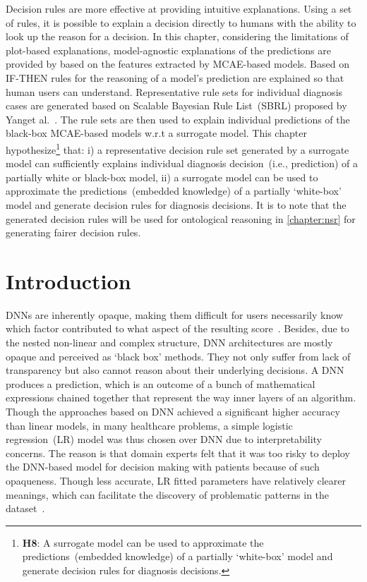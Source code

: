 \hspace*{3.5mm} Decision rules are more effective at providing intuitive explanations. Using a set of rules, it is possible to explain a decision directly to humans with the ability to look up the reason for a decision. In this chapter, considering the limitations of plot-based explanations, model-agnostic explanations of the predictions are provided by based on the features extracted by MCAE-based models. Based on IF-THEN rules for the reasoning of a model's prediction are explained so that human users can understand.  %
Representative rule sets for individual diagnosis cases are generated based on Scalable Bayesian Rule List~(SBRL) proposed by Yanget al.~\cite{BayesianRule}. The rule sets are then used to explain individual predictions of the black-box MCAE-based models w.r.t a surrogate model. 
This chapter hypothesize\footnote{\textbf{H8}: A surrogate model can be used to approximate the predictions~(embedded knowledge) of a partially `white-box' model and generate decision rules for diagnosis decisions.} that: i) a representative decision rule set generated by a surrogate model can sufficiently explains individual diagnosis decision~(i.e., prediction) of a partially white or black-box model, ii) a surrogate model can be used to approximate the predictions~(embedded knowledge) of a partially `white-box' model and generate decision rules for diagnosis decisions.
It is to note that the generated decision rules will be used for ontological reasoning in \cref{chapter:nsr} for generating fairer decision rules.


\section{Introduction} \label{chapter_7:intro}
DNNs are inherently opaque, making them difficult for users necessarily know which factor contributed to what aspect of the resulting score~\cite{ribeiro2018anchors}. Besides, due to the nested non-linear and complex structure, DNN architectures are mostly opaque and perceived as `black box' methods. They not only suffer from lack of transparency but also cannot reason about their underlying decisions. A DNN produces a prediction, which is an outcome of a bunch of mathematical expressions chained together that represent the way inner layers of an algorithm. Though the approaches based on DNN achieved a significant higher accuracy than linear models, in many healthcare problems, a simple logistic regression~(LR) model was thus chosen over DNN due to interpretability concerns. The reason is that domain experts felt that it was too risky to deploy the DNN-based model for decision making with patients because of such opaqueness. Though less accurate, LR fitted parameters have relatively clearer meanings, which can facilitate the discovery of problematic patterns in the dataset~\cite{ming2018rulematrix}. 

